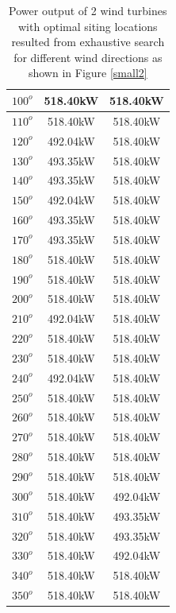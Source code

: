 \begin{table}[H]
\begin{tabular}{|c|c|c|}
                $100^o$ & 518.40kW & 518.40kW \\ \hline
                $110^o$ & 518.40kW & 518.40kW \\ \hline
                $120^o$ & 492.04kW & 518.40kW \\ \hline
                $130^o$ & 493.35kW & 518.40kW \\ \hline
                $140^o$ & 493.35kW & 518.40kW \\ \hline
                $150^o$ & 492.04kW & 518.40kW \\ \hline
                $160^o$ & 493.35kW & 518.40kW \\ \hline
                $170^o$ & 493.35kW & 518.40kW \\ \hline
                $180^o$ & 518.40kW & 518.40kW \\ \hline
                $190^o$ & 518.40kW & 518.40kW \\ \hline
                $200^o$ & 518.40kW & 518.40kW \\ \hline
                $210^o$ & 492.04kW & 518.40kW \\ \hline
                $220^o$ & 518.40kW & 518.40kW \\ \hline
                $230^o$ & 518.40kW & 518.40kW \\ \hline
                $240^o$ & 492.04kW & 518.40kW \\ \hline
                $250^o$ & 518.40kW & 518.40kW \\ \hline
                $260^o$ & 518.40kW & 518.40kW \\ \hline
                $270^o$ & 518.40kW & 518.40kW \\ \hline
                $280^o$ & 518.40kW & 518.40kW \\ \hline
                $290^o$ & 518.40kW & 518.40kW \\ \hline
                $300^o$ & 518.40kW & 492.04kW \\ \hline
                $310^o$ & 518.40kW & 493.35kW \\ \hline
                $320^o$ & 518.40kW & 493.35kW \\ \hline
                $330^o$ & 518.40kW & 492.04kW \\ \hline
                $340^o$ & 518.40kW & 518.40kW \\ \hline
                $350^o$ & 518.40kW & 518.40kW \\ \hline
            \end{tabular}
            \caption{Power output of 2 wind turbines with optimal siting locations resulted from exhaustive search for different wind directions as shown in Figure \ref{small2}}
            \label{table2}
        \end{table}
        \doublespacing
        
